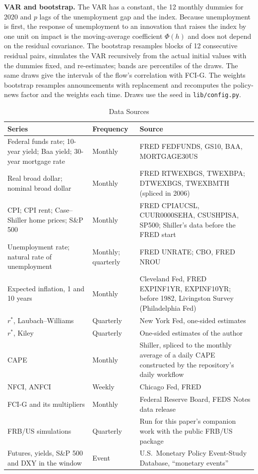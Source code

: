 \documentclass[11pt]{article}
\newcommand{\rs}{r^{*}}
\begin{document}
\begin{appendices}
\textbf{VAR and bootstrap.} The VAR has a constant, the 12 monthly dummies for 2020 and $p$ lags of the unemployment gap and the index. Because unemployment is first, the response of unemployment to an innovation that raises the index by one unit on impact is the moving-average coefficient $\Phi(h)$ and does not depend on the residual covariance. The bootstrap resamples blocks of 12 consecutive residual pairs, simulates the VAR recursively from the actual initial values with the dummies fixed, and re-estimates; bands are percentiles of the  draws. The same draws give the intervals of the flow's correlation with FCI-G. The weights bootstrap resamples announcements with replacement and recomputes the policy-news factor and the weights each time. Draws use the seed in \texttt{lib/config.py}.

\begin{table}[tp]\centering\small
\caption{Data Sources}\label{tab:data}
\begin{tabular}{p{}p{}p{}}\toprule
Series & Frequency & Source \\\midrule
Federal funds rate; 10-year yield; Baa yield; 30-year mortgage rate & Monthly & FRED FEDFUNDS, GS10, BAA, MORTGAGE30US \\
Real broad dollar; nominal broad dollar & Monthly & FRED RTWEXBGS, TWEXBPA; DTWEXBGS, TWEXBMTH (spliced in 2006) \\
CPI; CPI rent; Case--Shiller home prices; S\&P 500 & Monthly & FRED CPIAUCSL, CUUR0000SEHA, CSUSHPISA, SP500; Shiller's data before the FRED start \\
Unemployment rate; natural rate of unemployment & Monthly; quarterly & FRED UNRATE; CBO, FRED NROU \\
Expected inflation, 1 and 10 years & Monthly & Cleveland Fed, FRED EXPINF1YR, EXPINF10YR; before 1982, Livingston Survey (Philadelphia Fed) \\
$\rs$, Laubach--Williams & Quarterly & New York Fed, one-sided estimates \\
$\rs$, Kiley & Quarterly & One-sided estimates of the author \\
CAPE & Monthly & Shiller, spliced to the monthly average of a daily CAPE constructed by the repository's daily workflow \\
NFCI, ANFCI & Weekly & Chicago Fed, FRED \\
FCI-G and its multipliers & Monthly & Federal Reserve Board, FEDS Notes data release \\
FRB/US simulations & Quarterly & Run for this paper's companion work with the public FRB/US package \\
Futures, yields, S\&P 500 and DXY in the window & Event & U.S.\ Monetary Policy Event-Study Database, ``monetary events'' \citep{acosta2025} \\
\bottomrule
\end{tabular}
\end{table}


\end{appendices}
\end{document}
